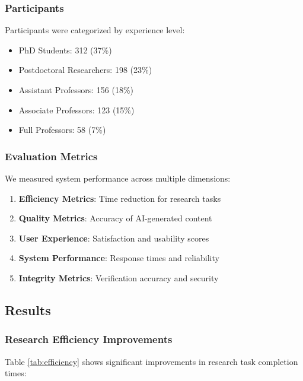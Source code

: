 \documentclass[10pt,twocolumn]{article}
\begin{document}
\subsubsection{Participants}

Participants were categorized by experience level:
\begin{itemize}
    \item PhD Students: 312 (37\%)
    \item Postdoctoral Researchers: 198 (23\%)
    \item Assistant Professors: 156 (18\%)
    \item Associate Professors: 123 (15\%)
    \item Full Professors: 58 (7\%)
\end{itemize}

\subsubsection{Evaluation Metrics}

We measured system performance across multiple dimensions:

\begin{enumerate}
    \item \textbf{Efficiency Metrics}: Time reduction for research tasks
    \item \textbf{Quality Metrics}: Accuracy of AI-generated content
    \item \textbf{User Experience}: Satisfaction and usability scores
    \item \textbf{System Performance}: Response times and reliability
    \item \textbf{Integrity Metrics}: Verification accuracy and security
\end{enumerate}

\subsection{Results}

\subsubsection{Research Efficiency Improvements}

Table \ref{tab:efficiency} shows significant improvements in research task completion times:
\end{document}
